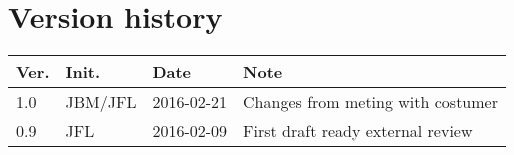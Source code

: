 \chapter*{Version history}
\label{app:rev_his}


\begin{tabular}{b{1cm} b{1cm} b{2cm} b{8cm}}
    \textbf{Ver.} & \textbf{Init.} & \textbf{Date} & \textbf{Note} \\
    \hline
    1.0 & JBM/JFL & 2016-02-21 & Changes from meting with costumer \\
    0.9 & JFL & 2016-02-09 & First draft ready external review \\
\end{tabular}
